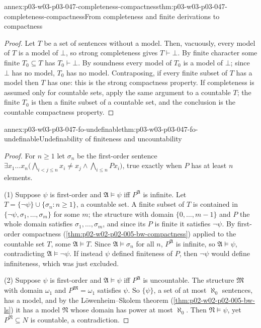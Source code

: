 \begin{annexitem}{annex:p03-w03-p03-047-completeness-compactness}{thm:p03-w03-p03-047-completeness-compactness}{From completeness and finite derivations to compactness}
\begin{proof}
Let \(T\) be a set of sentences without a model.  Then, vacuously, every
model of \(T\) is a model of \(\bot\), so strong completeness gives
\(T\vdash\bot\).  By finite character some finite \(T_0\subseteq T\) has
\(T_0\vdash\bot\).  By soundness every model of \(T_0\) is a model of
\(\bot\); since \(\bot\) has no model, \(T_0\) has no model.  Contraposing,
if every finite subset of \(T\) has a model then \(T\) has one: this is the
strong compactness property.  If completeness is assumed only for countable
sets, apply the same argument to a countable \(T\); the finite \(T_0\) is
then a finite subset of a countable set, and the conclusion is the countable
compactness property.
\end{proof}
\end{annexitem}

\begin{annexitem}{annex:p03-w03-p03-047-fo-undefinable}{thm:p03-w03-p03-047-fo-undefinable}{Undefinability of finiteness and uncountability}
\begin{proof}
For \(n\ge1\) let \(\sigma_n\) be the first-order sentence
\(\exists x_1\ldots x_n\bigl(\bigwedge_{i<j\le n}x_i\ne x_j\land
\bigwedge_{i\le n}Px_i\bigr)\), true exactly when \(P\) has at least \(n\)
elements.

(1) Suppose \(\psi\) is first-order and \(\mathfrak A\models\psi\) iff
\(P^{\mathfrak A}\) is infinite.  Let
\(T=\{\neg\psi\}\cup\{\sigma_n:n\ge1\}\), a countable set.  A finite subset
of \(T\) is contained in \(\{\neg\psi,\sigma_1,\ldots,\sigma_m\}\) for some
\(m\); the structure with domain \(\{0,\ldots,m-1\}\) and \(P\) the whole
domain satisfies \(\sigma_1,\ldots,\sigma_m\), and since its \(P\) is finite
it satisfies \(\neg\psi\).  By first-order compactness
(\cref{thm:p02-w02-p02-005-bw-compactness}) applied to the countable set \(T\), some
\(\mathfrak A\models T\).  Since \(\mathfrak A\models\sigma_n\) for all
\(n\), \(P^{\mathfrak A}\) is infinite, so \(\mathfrak A\models\psi\),
contradicting \(\mathfrak A\models\neg\psi\).  If instead \(\psi\) defined
finiteness of \(P\), then \(\neg\psi\) would define infiniteness, which was
just excluded.

(2) Suppose \(\psi\) is first-order and \(\mathfrak A\models\psi\) iff
\(P^{\mathfrak A}\) is uncountable.  The structure \(\mathfrak M\) with
domain \(\omega_1\) and \(P^{\mathfrak M}=\omega_1\) satisfies \(\psi\).  So
\(\{\psi\}\), a set of at most \(\aleph_0\) sentences, has a model, and by
the L\"owenheim--Skolem theorem (\cref{thm:p02-w02-p02-005-bw-ls}) it has a
model \(\mathfrak N\) whose domain has power at most \(\aleph_0\).  Then
\(\mathfrak N\models\psi\), yet \(P^{\mathfrak N}\subseteq N\) is countable,
a contradiction.
\end{proof}
\end{annexitem}

